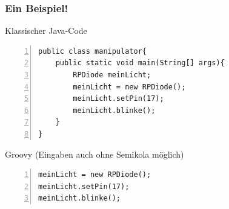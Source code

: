 \documentclass[usenames,dvipsnames]{beamer}
\begin{document}

\begin{frame}[containsverbatim]
\frametitle{Ein Beispiel!}
\begin{block}{Klassischer Java-Code}
\lstset{language=Java}
\begin{lstlisting}[numbers=left, stepnumber=1, numberstyle =\tiny\color{black!30}]
public class manipulator{ 
    public static void main(String[] args){
        RPDiode meinLicht;
        meinLicht = new RPDiode();
        meinLicht.setPin(17);
        meinLicht.blinke();
    }
}
\end{lstlisting}
\end{block}

\vspace{-2mm}
\begin{block}{Groovy (Eingaben auch ohne Semikola möglich)}
\lstset{language=Java}
\begin{lstlisting}[numbers=left, stepnumber=1, numberstyle =\tiny\color{black!30}]
meinLicht = new RPDiode();
meinLicht.setPin(17);
meinLicht.blinke();
\end{lstlisting}
\end{block}
\end{frame}

\end{document}
